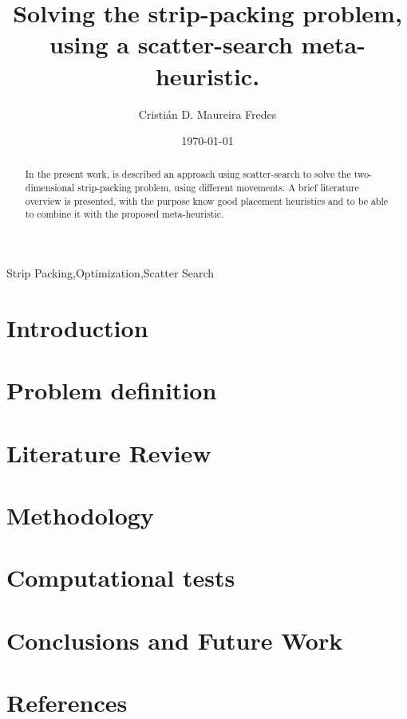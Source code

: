 \documentclass[preprint,authoryear,12pt]{elsarticle}
\begin{document}
\begin{frontmatter}

\title{Solving the strip-packing problem, using a scatter-search meta-heuristic.}
\author[utfsm]{Cristián D. Maureira Fredes}


\address[utfsm]{Departamento de Informática, Universidad Técnica Federico Santa María, Av. España 1680, Valparaiso, Chile}
\date{\today}

\begin{abstract}
In the present work, is described an approach using scatter-search
to solve the two-dimensional strip-packing problem,
using different movements.
A brief literature overview is presented,
with the purpose know good placement heuristics and
to be able to combine it with the proposed meta-heuristic.
\end{abstract}

\begin{keyword}
Strip Packing\sep Optimization\sep Scatter Search
\end{keyword}

\end{frontmatter}

\section{Introduction}
\label{introduction}


\section{Problem definition}
\label{problem}


\section{Literature Review}
\label{stateofart}


\section{Methodology}
\label{methodology}


\section{Computational tests}
\label{tests}


\section{Conclusions and Future Work}
\label{conclusions}


\section*{References}
%


\end{document}
